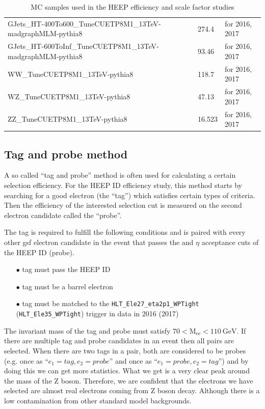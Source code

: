 \begin{table}[htp]
\begin{center}
{\begin{tabular}{|l|l|l|}
GJets\_HT-400To600\_TuneCUETP8M1\_13TeV-madgraphMLM-pythia8             & 274.4   & for 2016, 2017        \\
GJets\_HT-600ToInf\_TuneCUETP8M1\_13TeV-madgraphMLM-pythia8             & 93.46   & for 2016, 2017         \\
\hline
WW\_TuneCUETP8M1\_13TeV-pythia8                                         & 118.7   & for 2016, 2017         \\
WZ\_TuneCUETP8M1\_13TeV-pythia8                                         & 47.13   & for 2016, 2017         \\
ZZ\_TuneCUETP8M1\_13TeV-pythia8                                         & 16.523  & for 2016, 2017         \\
\hline
\end{tabular}}
\caption{MC samples used in the HEEP efficiency and scale factor studies}
\label{tab:HEEPSF-samples}
  \end{center}
\end{table}


\subsection{Tag and probe method}
\label{subsubsec:Same_sign_method}
A so called ``tag and probe'' method is often used for calculating a certain selection efficiency. For the HEEP ID efficiency study, this method starts by searching for a good electron (the ``tag'') which satisfies certain types of criteria. Then the efficiency of the interested selection cut is measured on the second electron candidate called the ``probe''.

The tag is required to fulfill the following conditions and is paired with every other gsf electron candidate in the event that passes the \et and $\eta$ acceptance cuts of the HEEP ID (probe).
\begin{itemize}
  \item[$\bullet$] tag must pass the HEEP ID
  \item[$\bullet$] tag must be a barrel electron
  \item[$\bullet$] tag must be matched to the \texttt{HLT\_Ele27\_eta2p1\_WPTight} (\texttt{HLT\_Ele35\_WPTight}) trigger in data in 2016 (2017)
\end{itemize}
The invariant mass of the tag and probe must satisfy $70 < \mathrm{M_{ee}} < 110 ~\mathrm{GeV}$. If there are multiple tag and probe candidates in an event then all pairs are selected.
When there are two tags in a pair, both are considered to be probes (e.g. once as ``$e_1 = tag , e_2 = probe$'' and once as ``$e_1 = probe , e_2 = tag$'') and by doing this we can get more statistics.
What we get is a very clear peak around the mass of the Z boson.
Therefore, we are confident that the electrons we have selected are almost real electrons coming from Z boson decay. Although there is a low contamination from other standard model backgrounds.

